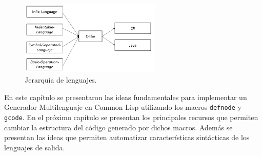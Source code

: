 \begin{figure}
	\centering
	\includegraphics[width=0.6\textwidth]{Adol-jerarquia.png}
	\caption{Jerarquía de lenguajes.}
	\label{Adol8}
\end{figure}

En este capítulo se presentaron las ideas fundamentales para implementar un Generador Multilenguaje en Common Lisp utilizando los macros \texttt{defnode} y \texttt{gcode}. En el próximo capítulo se presentan los principales recursos que permiten cambiar la estructura del código generado por dichos macros. Además se presentan las ideas que permiten automatizar características sintácticas  de los lenguajes de salida.
  

